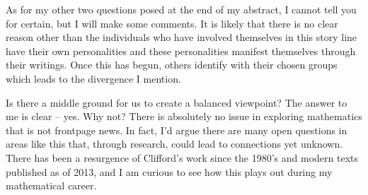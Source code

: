 \documentclass[12pt]{article}
\begin{document}
As for my other two questions posed at the end of my abstract, I cannot tell you for certain, but I will make some comments. It is likely that there is no clear reason other than the individuals who have involved themselves in this story line have their own personalities and these personalities manifest themselves through their writings. Once this has begun, others identify with their chosen groups which leads to the divergence I mention.

Is there a middle ground for us to create a balanced viewpoint? The answer to me is clear -- yes. Why not? There is absolutely no issue in exploring mathematics that is not frontpage news. In fact, I'd argue there are many open questions in areas like this that, through research, could lead to connections yet unknown. There has been a resurgence of Clifford's work since the 1980's and modern texts published as of 2013, and I am curious to see how this plays out during my mathematical career.





\end{document}
